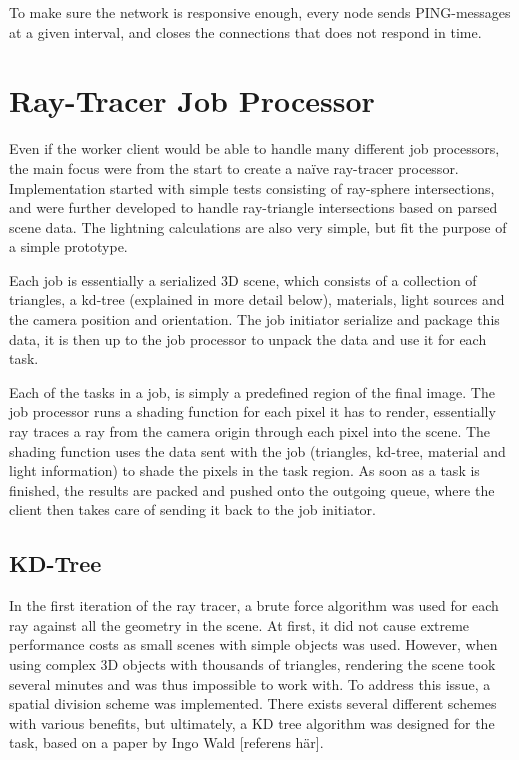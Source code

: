 
To make sure the network is responsive enough, every node sends PING-messages at a given interval, and closes the connections that does not respond in time.

\section{Ray-Tracer Job Processor}
Even if the worker client would be able to handle many different job processors, the main focus were from the start to create a naïve ray-tracer processor. Implementation started with simple tests consisting of ray-sphere intersections, and were further developed to handle ray-triangle intersections based on parsed scene data. The lightning calculations are also very simple, but fit the purpose of a simple prototype.

Each job is essentially a serialized 3D scene, which consists of a collection of triangles, a kd-tree (explained in more detail below), materials, light sources and the camera position and orientation. The job initiator serialize and package this data, it is then up to the job processor to unpack the data and use it for each task.

Each of the tasks in a job, is simply a predefined region of the final image. The job processor runs a shading function for each pixel it has to render, essentially ray traces a ray from the camera origin through each pixel into the scene. The shading function uses the data sent with the job (triangles, kd-tree, material and light information) to shade the pixels in the task region. As soon as a task is finished, the results are packed and pushed onto the outgoing queue, where the client then takes care of sending it back to the job initiator.

\subsection{KD-Tree}
In the first iteration of the ray tracer, a brute force algorithm was used for each ray against all the geometry in the scene. At first, it did not cause extreme performance costs as small scenes with simple objects was used. However, when using complex 3D objects with thousands of triangles, rendering the scene took several minutes and was thus impossible to work with. To address this issue, a spatial division scheme was implemented. There exists several different schemes with various benefits, but ultimately, a KD tree algorithm was designed for the task, based on a paper by Ingo Wald [referens här]. 

